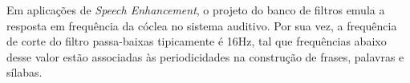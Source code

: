 Em aplicações de \textit{Speech Enhancement}, o projeto do banco de filtros
emula a resposta em frequência da cóclea no sistema auditivo. Por sua vez, a
frequência de corte do filtro passa-baixas tipicamente é 16Hz, tal que
frequências abaixo desse valor estão associadas às periodicidades na construção
de frases, palavras e sílabas.